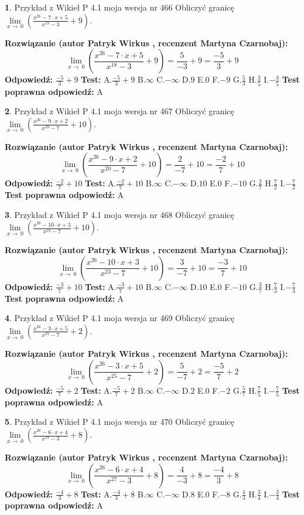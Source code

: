 \documentclass[12pt, a4paper]{article}
\theoremstyle{definition} %
\newtheorem{zad}{}
\newcommand{\zadStart}[1]{\begin{zad}#1\newline}
\newcommand{\zadStop}{\end{zad}}
\newcommand{\rozwStart}[2]{\noindent \textbf{Rozwiązanie (autor #1 , recenzent #2): }\newline}
\newcommand{\rozwStop}{\newline}
\newcommand{\odpStart}{\noindent \textbf{Odpowiedź:}\newline}
\newcommand{\odpStop}{\newline}
\newcommand{\testStart}{\noindent \textbf{Test:}\newline}
\newcommand{\testStop}{\newline}
\newcommand{\kluczStart}{\noindent \textbf{Test poprawna odpowiedź:}\newline}
\newcommand{\kluczStop}{\newline}
\begin{document}
\zadStart{Przykład z Wikieł P 4.1 moja wersja nr 466}
Obliczyć granicę $\lim\limits_{x\to\ 0}(\frac{x^{26}-7 \cdot x +5}{x^{18}-3}+9)$.
\zadStop
\rozwStart{Patryk Wirkus}{Martyna Czarnobaj}
$$\lim\limits_{x\to\ 0}(\frac{x^{26}-7 \cdot x +5}{x^{18}-3}+9)=\frac{5}{-3}+9=\frac{-5}{3}+9$$
\rozwStop
\odpStart
$\frac{-5}{3}+9$
\odpStop
\testStart
A.$\frac{-5}{3}+9$
B.$\infty$
C.$-\infty$
D.$9$
E.$0$
F.$-9$
G.$\frac{5}{3}$
H.$\frac{3}{5}$
I.$-\frac{3}{5}$
\testStop
\kluczStart
A
\kluczStop



\zadStart{Przykład z Wikieł P 4.1 moja wersja nr 467}
Obliczyć granicę $\lim\limits_{x\to\ 0}(\frac{x^{26}-9 \cdot x +2}{x^{20}-7}+10)$.
\zadStop
\rozwStart{Patryk Wirkus}{Martyna Czarnobaj}
$$\lim\limits_{x\to\ 0}(\frac{x^{26}-9 \cdot x +2}{x^{20}-7}+10)=\frac{2}{-7}+10=\frac{-2}{7}+10$$
\rozwStop
\odpStart
$\frac{-2}{7}+10$
\odpStop
\testStart
A.$\frac{-2}{7}+10$
B.$\infty$
C.$-\infty$
D.$10$
E.$0$
F.$-10$
G.$\frac{2}{7}$
H.$\frac{7}{2}$
I.$-\frac{7}{2}$
\testStop
\kluczStart
A
\kluczStop



\zadStart{Przykład z Wikieł P 4.1 moja wersja nr 468}
Obliczyć granicę $\lim\limits_{x\to\ 0}(\frac{x^{26}-10 \cdot x +3}{x^{23}-7}+10)$.
\zadStop
\rozwStart{Patryk Wirkus}{Martyna Czarnobaj}
$$\lim\limits_{x\to\ 0}(\frac{x^{26}-10 \cdot x +3}{x^{23}-7}+10)=\frac{3}{-7}+10=\frac{-3}{7}+10$$
\rozwStop
\odpStart
$\frac{-3}{7}+10$
\odpStop
\testStart
A.$\frac{-3}{7}+10$
B.$\infty$
C.$-\infty$
D.$10$
E.$0$
F.$-10$
G.$\frac{3}{7}$
H.$\frac{7}{3}$
I.$-\frac{7}{3}$
\testStop
\kluczStart
A
\kluczStop



\zadStart{Przykład z Wikieł P 4.1 moja wersja nr 469}
Obliczyć granicę $\lim\limits_{x\to\ 0}(\frac{x^{26}-3 \cdot x +5}{x^{25}-7}+2)$.
\zadStop
\rozwStart{Patryk Wirkus}{Martyna Czarnobaj}
$$\lim\limits_{x\to\ 0}(\frac{x^{26}-3 \cdot x +5}{x^{25}-7}+2)=\frac{5}{-7}+2=\frac{-5}{7}+2$$
\rozwStop
\odpStart
$\frac{-5}{7}+2$
\odpStop
\testStart
A.$\frac{-5}{7}+2$
B.$\infty$
C.$-\infty$
D.$2$
E.$0$
F.$-2$
G.$\frac{5}{7}$
H.$\frac{7}{5}$
I.$-\frac{7}{5}$
\testStop
\kluczStart
A
\kluczStop



\zadStart{Przykład z Wikieł P 4.1 moja wersja nr 470}
Obliczyć granicę $\lim\limits_{x\to\ 0}(\frac{x^{26}-6 \cdot x +4}{x^{27}-3}+8)$.
\zadStop
\rozwStart{Patryk Wirkus}{Martyna Czarnobaj}
$$\lim\limits_{x\to\ 0}(\frac{x^{26}-6 \cdot x +4}{x^{27}-3}+8)=\frac{4}{-3}+8=\frac{-4}{3}+8$$
\rozwStop
\odpStart
$\frac{-4}{3}+8$
\odpStop
\testStart
A.$\frac{-4}{3}+8$
B.$\infty$
C.$-\infty$
D.$8$
E.$0$
F.$-8$
G.$\frac{4}{3}$
H.$\frac{3}{4}$
I.$-\frac{3}{4}$
\testStop
\kluczStart
A
\kluczStop
\end{document}
